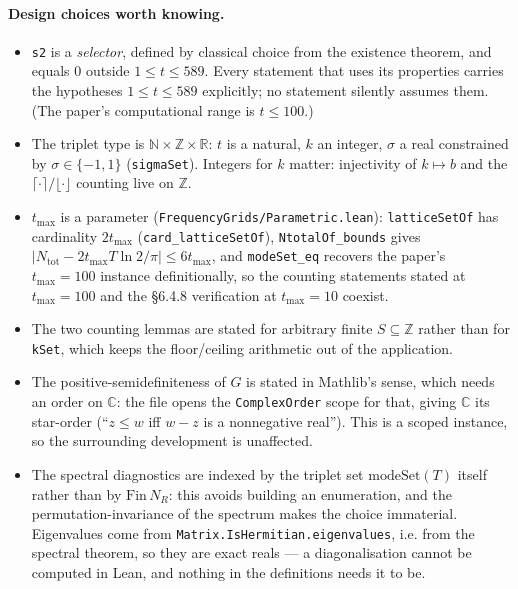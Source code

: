 \documentclass[11pt,a4paper]{article}
\newcommand{\R}{\mathbb{R}}
\newcommand{\N}{\mathbb{N}}
\newcommand{\Z}{\mathbb{Z}}
\newcommand{\C}{\mathbb{C}}
\newcommand{\lb}{\_\allowbreak}
\newcommand{\code}[1]{\texttt{#1}}
\newcommand{\itemization}[1]{\begin{itemize}[leftmargin=1.4em,itemsep=1pt,topsep=2pt]#1\end{itemize}}
\theoremstyle{definition}
\theoremstyle{remark}
\begin{document}
\paragraph{Design choices worth knowing.}
\itemization{
\item \code{s2} is a \emph{selector}, defined by classical choice from the existence
  theorem, and equals $0$ outside $1\le t\le589$.  Every statement that uses its
  properties carries the hypotheses $1\le t\le589$ explicitly; no statement silently
  assumes them.  (The paper's computational range is $t\le100$.)
\item The triplet type is $\N\times\Z\times\R$: $t$ is a natural, $k$ an integer, $\sigma$
  a real constrained by $\sigma\in\{-1,1\}$ (\code{sigmaSet}).  Integers for $k$ matter:
  injectivity of $k\mapsto b$ and the $\lceil\cdot\rceil/\lfloor\cdot\rfloor$ counting live
  on $\Z$.
\item $t_{\max}$ is a parameter (\code{FrequencyGrids/Parametric.lean}): \code{latticeSetOf}
  has cardinality $2t_{\max}$ (\code{card\lb latticeSetOf}), \code{NtotalOf\lb bounds} gives
  $|N_{\mathrm{tot}}-2t_{\max}T\ln2/\pi|\le6t_{\max}$, and \code{modeSet\lb eq} recovers the
  paper's $t_{\max}=100$ instance definitionally, so the counting statements stated at
  $t_{\max}=100$ and the \S6.4.8 verification at $t_{\max}=10$ coexist.
\item The two counting lemmas are stated for arbitrary finite $S\subseteq\Z$ rather than for
  \code{kSet}, which keeps the floor/ceiling arithmetic out of the application.
\item The positive-semidefiniteness of $G$ is stated in Mathlib's sense, which needs an order
  on $\C$: the file opens the \code{ComplexOrder} scope for that, giving $\C$ its star-order
  (``$z\le w$ iff $w-z$ is a nonnegative real'').  This is a scoped instance, so the
  surrounding development is unaffected.
\item The spectral diagnostics are indexed by the triplet set $\mathrm{modeSet}(T)$ itself
  rather than by $\mathrm{Fin}\,N_R$: this avoids building an enumeration, and the
  permutation-invariance of the spectrum makes the choice immaterial.  Eigenvalues come from
  \code{Matrix.IsHermitian.eigenvalues}, i.e. from the spectral theorem, so they are exact
  reals --- a diagonalisation cannot be computed in Lean, and nothing in the definitions
  needs it to be.
}
\end{document}
